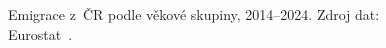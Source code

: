 \def\strProblemyEmigraceVyvojCaption{\centering Emigrace z~ČR podle věkové skupiny, 2014--2024. Zdroj dat: Eurostat~\cite{eurostat_migr_emi1ctz}.}%
%
\begin{figure}[htbp]
  \centering
  \resizebox{0.95\linewidth}{!}{}
  \caption{\strProblemyEmigraceVyvojCaption}
  \label{fig:problemy_emigrace_vyvoj}
\end{figure}

